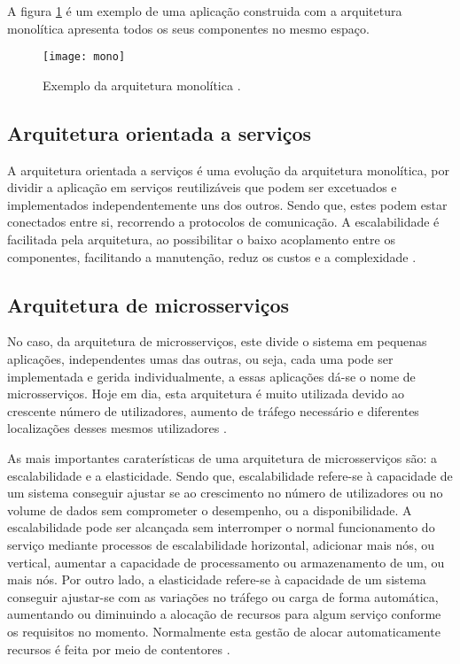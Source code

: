A figura \ref{fig:exemplo1} é um exemplo de uma aplicação construida com a arquitetura monolítica apresenta todos os seus componentes no mesmo espaço.

\begin{figure}[H]
	\centering
	\texttt{[image: mono]}
	\caption{Exemplo da arquitetura monolítica \cite{imagensMonoMicro}.}
	\label{fig:exemplo1}
\end{figure}

\subsection{Arquitetura orientada a serviços}

A arquitetura orientada a serviços é uma evolução da arquitetura monolítica, por dividir a aplicação em serviços reutilizáveis que podem ser excetuados e implementados independentemente uns dos outros. Sendo que, estes podem estar conectados entre si, recorrendo a protocolos de comunicação. A escalabilidade é facilitada pela arquitetura, ao possibilitar o baixo acoplamento entre os componentes, facilitando a manutenção, reduz os custos e a complexidade \cite{serviços}.

\subsection{Arquitetura de microsserviços}

No caso, da arquitetura de microsserviços, este divide o sistema em pequenas aplicações, independentes umas das outras, ou seja, cada uma pode ser implementada e gerida individualmente, a essas aplicações dá-se o nome de microsserviços. Hoje em dia, esta arquitetura é muito utilizada devido ao crescente número de utilizadores, aumento de tráfego necessário e diferentes localizações desses mesmos utilizadores \cite{whymicroservices}.

As mais importantes caraterísticas de uma arquitetura de microsserviços são: a escalabilidade e a elasticidade. Sendo que, escalabilidade refere-se à capacidade de um sistema conseguir ajustar se ao crescimento no número de utilizadores ou no volume de dados sem comprometer o desempenho, ou a disponibilidade. A escalabilidade pode ser alcançada sem interromper o normal funcionamento do serviço mediante processos de escalabilidade horizontal, adicionar mais nós, ou vertical, aumentar a capacidade de processamento ou armazenamento de um, ou mais nós. Por outro lado, a elasticidade refere-se à capacidade de um sistema conseguir ajustar-se com as variações no tráfego ou carga de forma automática, aumentando ou diminuindo a alocação de recursos para algum serviço conforme os requisitos no momento. Normalmente esta gestão de alocar automaticamente recursos é feita por meio de contentores \cite{escalabilidade} \cite{escalabilidade1}.


